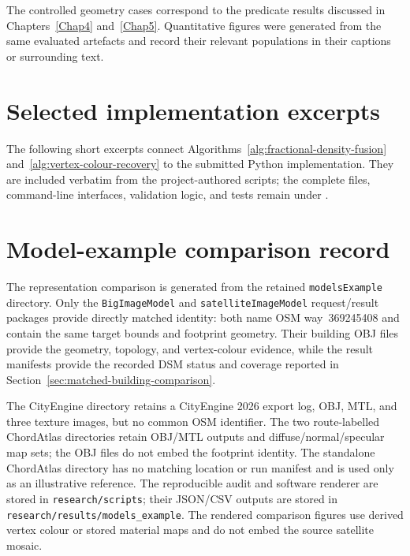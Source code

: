 \documentclass[12pt, a4paper]{report}
\begin{document}
\begin{appendices}
The controlled geometry cases correspond to the predicate results discussed in
Chapters~\ref{Chap4} and~\ref{Chap5}.  Quantitative figures were generated from
the same evaluated artefacts and record their relevant populations in their
captions or surrounding text.

\section{Selected implementation excerpts}

The following short excerpts connect Algorithms~\ref{alg:fractional-density-fusion}
and~\ref{alg:vertex-colour-recovery} to the submitted Python implementation.
They are included verbatim from the project-authored scripts; the complete
files, command-line interfaces, validation logic, and tests remain under
.





\section{Model-example comparison record}

The representation comparison is generated from the retained
\texttt{modelsExample} directory.  Only the \texttt{BigImageModel} and
\texttt{satelliteImageModel} request/result packages provide directly matched
identity: both name OSM way~369245408 and contain the same target bounds and
footprint geometry.  Their building OBJ files provide the geometry, topology,
and vertex-colour evidence, while the result manifests provide the recorded DSM
status and coverage reported in
Section~\ref{sec:matched-building-comparison}.

The CityEngine directory retains a CityEngine 2026 export log, OBJ, MTL, and
three texture images, but no common OSM identifier.  The two route-labelled
ChordAtlas directories retain OBJ/MTL outputs and diffuse/normal/specular map
sets; the OBJ files do not embed the footprint identity.  The standalone
ChordAtlas directory has no matching location or run manifest and is used only
as an illustrative reference.  The reproducible audit and software renderer
are stored in \texttt{research/scripts}; their JSON/CSV outputs are stored in
\texttt{research/results/models\_example}.  The rendered comparison figures use
derived vertex colour or stored material maps and do not embed the source
satellite mosaic.


\end{appendices}
\end{document}
